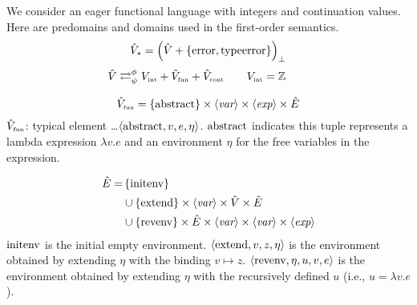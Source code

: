 \begin{enumcirc}
	We consider an eager functional language with integers and continuation values.
	Here are predomains and domains used in the first-order semantics.
	\[
		\begin{array}{c}
			\hat{V}_* = \left( \hat{V} + \left\{ \textrm{error}, \textrm{typeerror} \right\} \right)_\bot \\[1em]
			\hat{V} \mathrel{\mathop{\rightleftarrows}^{\mathrm{\phi}}_{\mathrm{\psi}}} V_{\textrm{\tiny int}} + \hat{V}_{\textrm{\tiny fun}} + \hat{V}_{\textrm{\tiny cont}}
			\qquad
			V_{\textrm{\tiny int}} = \mathbb{Z} \qquad
		\end{array}
	\]

	\[
		\hat{V}_{\textrm{\tiny fun}} = \left\{ \textrm{abstract} \right\} \times \left\langle \textit{var} \right\rangle \times \left\langle \textit{exp} \right\rangle \times \hat{E}
	\]
	$\hat{V}_{\textrm{\tiny fun}}$: typical element \dots $\left\langle \textrm{abstract}, v, e, \eta \right\rangle$.
	$\textrm{abstract}$ indicates this tuple represents a lambda expression $\lambda v . e$
	and an environment $\eta$ for the free variables in the expression.

	\begin{align*}
		\hat{E} = & \left\{ \textrm{initenv} \right\}                                                                          \\
		          & \cup \left\{ \textrm{extend} \right\} \times \left\langle \textit{var} \right\rangle \times \hat{V} \times \hat{E}                      \\
		          & \cup \left\{ \textrm{revenv} \right\} \times \hat{E} \times \left\langle \textit{var} \right\rangle \times \left\langle \textit{var} \right\rangle \times \left\langle \textit{exp} \right\rangle
	\end{align*}
	$\textrm{initenv}$ is the initial empty environment.
	$\left\langle \textrm{extend}, v, z, \eta \right\rangle$ is the environment obtained by extending
	$\eta$ with the binding $v \mapsto z$.
	$\left\langle \textrm{revenv}, \eta, u, v, e \right\rangle$ is the environment obtained by extending
	$\eta$ with the recursively defined $u$ (i.e., $u = \lambda v. e$).


\end{enumcirc}

